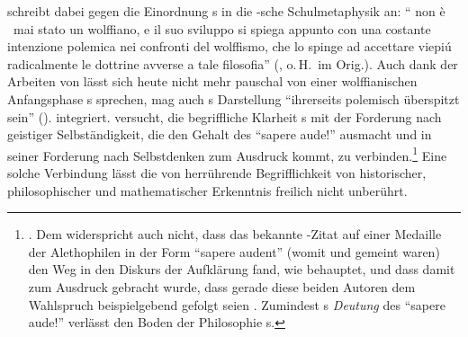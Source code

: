 {
schreibt dabei gegen die Einordnung s in die
-sche
Schulmetaphysik an: \enquote{ non \`{e} \punkt\ mai stato
un wolffiano, e il suo sviluppo si spiega appunto con una costante
intenzione polemica nei confronti del wolffismo, che lo spinge ad
accettare viepi\'{u} radicalmente le dottrine avverse a tale filosofia}
(\cite[][vii]{Tonelli:ElementimetodologiciemetafisiciinKantdal1745al17681959},
o.\,H.\ im Orig.).
Auch dank der Arbeiten von
lässt sich heute nicht mehr pauschal von einer wolffianischen Anfangsphase
s sprechen, mag auch
s
Darstellung \enquote{ihrerseits polemisch überspitzt sein}
\mkbibparens{\cite[][31]{Schwaiger:KategorischeundandereImperative1999}}.} integriert.
 versucht, die begriffliche Klarheit
s mit der Forderung nach geistiger
Selbständigkeit, die den Gehalt des \enquote{sapere aude!} ausmacht und in
seiner Forderung nach Selbstdenken zum Ausdruck kommt, zu
verbinden.\footnote{\cite[Vgl.][]{Albrecht:KantsKritikderhistorischenErkenntnis--einBekenntniszuWolff?1982}.
Dem widerspricht auch nicht, dass das bekannte -Zitat auf
einer Medaille der Alethophilen in der Form \enquote{sapere audent} (womit
 und
 gemeint waren) den Weg in den
Diskurs der Aufklärung fand, wie
\textcite[vgl.][256]{Bronisch:WasistAufklaerung?2011} behauptet, und dass damit
zum Ausdruck gebracht wurde, dass gerade diese beiden Autoren dem Wahlspruch
beispielgebend gefolgt seien
\parencite[vgl.][263]{Doering:enquoteSapereaudeoderdieNotwendigkeitderautonomenVernunft2011}.
Zumindest s \emph{Deutung} des \enquote{sapere aude!} verlässt den
Boden der Philosophie s.} Eine solche
Verbindung lässt die von  herrührende
Begrifflichkeit von historischer, philosophischer und mathematischer Erkenntnis
freilich nicht unberührt.
